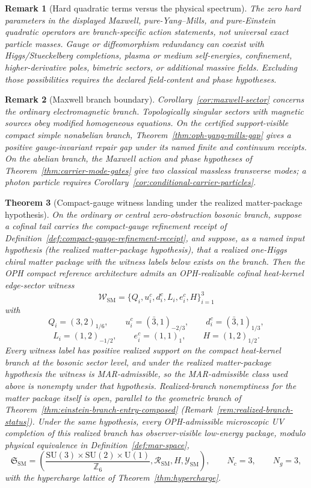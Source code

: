 \documentclass[11pt]{article}
\newtheorem{theorem}{Theorem}[section]
\newtheorem{remark}[theorem]{Remark}
\newcommand{\SU}{\mathrm{SU}}
\newcommand{\U}{\mathrm{U}}
\begin{document}
\begin{remark}[Hard quadratic terms versus the physical spectrum]
The zero hard parameters in the displayed Maxwell, pure-Yang--Mills, and pure-Einstein quadratic
operators are branch-specific action statements, not universal exact particle masses. Gauge or
diffeomorphism redundancy can coexist with Higgs/Stueckelberg completions, plasma or medium
self-energies, confinement, higher-derivative poles, bimetric sectors, or additional massive
fields. Excluding those possibilities requires the declared field-content and phase hypotheses.
\end{remark}

\begin{remark}[Maxwell branch boundary]
Corollary~\ref{cor:maxwell-sector} concerns the ordinary electromagnetic branch. Topologically
singular sectors with magnetic sources obey modified homogeneous equations. On the certified
support-visible compact simple nonabelian branch, Theorem~\ref{thm:oph-yang-mills-gap} gives a
positive gauge-invariant repair gap under its named finite and continuum receipts. On the abelian
branch, the Maxwell action and phase hypotheses of Theorem~\ref{thm:carrier-mode-gates} give two
classical massless transverse modes; a photon particle requires
Corollary~\ref{cor:conditional-carrier-particles}.
\end{remark}

\begin{theorem}[Compact-gauge witness landing under the realized matter-package hypothesis]\label{thm:mar-witness-landing}
On the ordinary or central zero-obstruction bosonic branch, suppose a cofinal tail carries the
compact-gauge refinement receipt of Definition~\ref{def:compact-gauge-refinement-receipt}, and
suppose, as a named input hypothesis (the realized matter-package hypothesis), that a realized
one-Higgs chiral matter package with the witness labels below exists on the branch. Then
the OPH compact reference architecture admits an OPH-realizable cofinal heat-kernel edge-sector witness
\[
\mathcal W_{\mathrm{SM}}
=
\{Q_i,u_i^c,d_i^c,L_i,e_i^c,H\}_{i=1}^{3}
\]
with
\[
Q_i=(3,2)_{1/6},\qquad
u_i^c=(\bar 3,1)_{-2/3},\qquad
d_i^c=(\bar 3,1)_{1/3},
\]
\[
L_i=(1,2)_{-1/2},\qquad
e_i^c=(1,1)_1,\qquad
H=(1,2)_{1/2}.
\]
Every witness label has positive realized support on the compact heat-kernel branch at the bosonic sector level, and under the realized matter-package hypothesis the witness is MAR-admissible, so the MAR-admissible class used above is nonempty under that hypothesis. Realized-branch nonemptiness for the matter package itself is open, parallel to the geometric branch of Theorem~\ref{thm:einstein-branch-entry-composed} (Remark~\ref{rem:realized-branch-status}). Under the same hypothesis, every OPH-admissible microscopic UV completion of this realized branch has observer-visible low-energy package, modulo physical equivalence in Definition~\ref{def:mar-space},
\[
\mathfrak S_{\mathrm{SM}}
=
\left(
\frac{\SU(3)\times\SU(2)\times\U(1)}{\mathbb Z_6},
\mathcal R_{\mathrm{SM}},
H,
\mathcal Y_{\mathrm{SM}}
\right),
\qquad
N_c=3,\qquad N_g=3,
\]
with the hypercharge lattice of Theorem~\ref{thm:hypercharge}.
\end{theorem}
\end{document}
